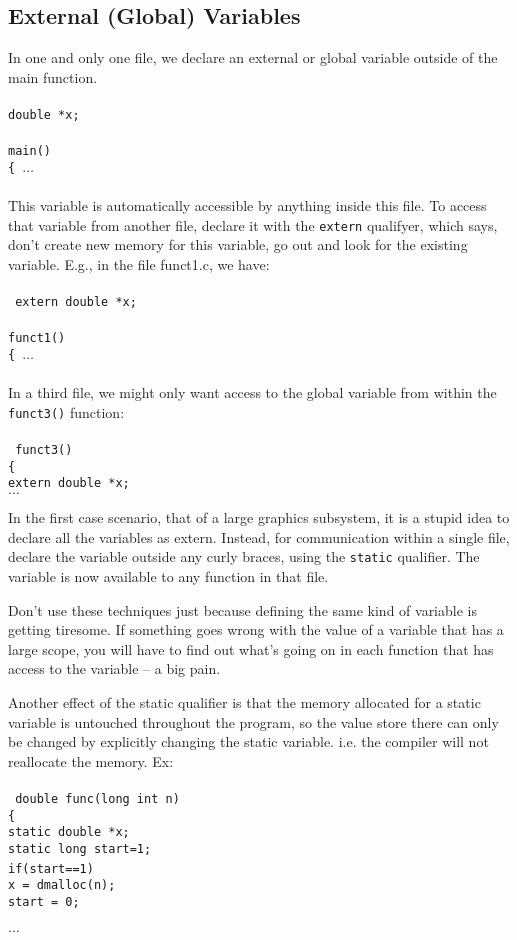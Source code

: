 \documentclass{article}
\begin{document}
\subsection{External (Global) Variables}
\label{sec:variables}

In one and only one file, we declare an external or global variable outside of the
main function.\\\\
{\tt double *x;\\\\
main()\\
\{ $\ldots$}\\\\
This variable is automatically accessible by anything inside this file.  To access
that variable from another file, declare it with the {\tt extern} qualifyer, which
says, don't create new memory for this variable, go out and look for the existing
variable.  E.g., in the file funct1.c, we have:\\\\
{\tt
extern double *x;\\\\
funct1()\\
\{ $\ldots$}\\\\
In a third file, we might only want access to the global variable from within 
the {\tt funct3()} function:\\\\
{\tt
funct3()\\
\{\\
extern double *x;\\
$\ldots$}

In the first case scenario, that of a large graphics subsystem, it is a stupid idea
to declare all the variables as extern.  Instead, for communication within
a single file, declare the variable outside any curly braces, using the {\tt static} 
qualifier.  The variable is now available to any function in that file.  

Don't use these techniques just because defining the same kind of variable is getting
tiresome.  If something goes wrong with the value of a variable that has a large scope,
you will have to find out what's going on in each function that has access to the variable --
a big pain.

Another effect of the static qualifier is that the memory allocated for a static variable
is untouched throughout the program, so the value store there can only be changed by 
explicitly changing the static variable.  i.e. the compiler will not reallocate the memory.
Ex:\\\\
{\tt
double func(long int n)\\
\{\\
static double *x;\\
static long start=1;\\
if(start==1){\\
x = dmalloc(n);\\
start = 0;\\
}\\
$\ldots$}
\end{document}
